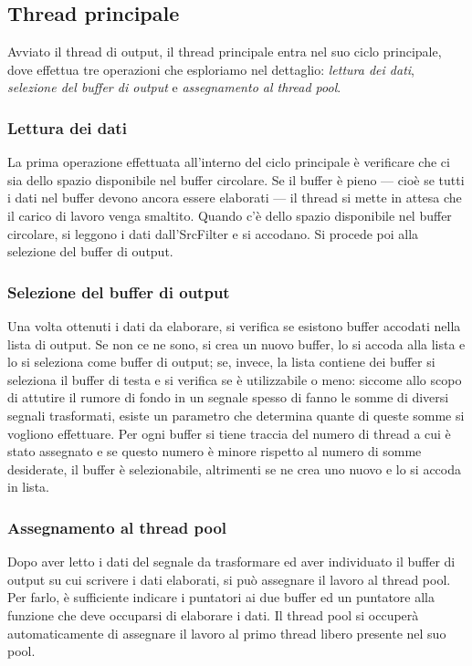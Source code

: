 \subsection{Thread principale}
Avviato il thread di output, il thread principale entra nel suo ciclo
principale, dove effettua tre operazioni che esploriamo nel dettaglio:
\emph{lettura dei dati}, \emph{selezione del buffer di output} e
\emph{assegnamento al thread pool}.
\subsubsection{Lettura dei dati}
La prima operazione effettuata all'interno del ciclo principale \`e verificare
che ci sia dello spazio disponibile nel buffer circolare. Se il buffer \`e
pieno --- cio\`e se tutti i dati nel buffer devono ancora essere elaborati ---
il thread si mette in attesa che il carico di lavoro venga smaltito. Quando
c'\`e dello spazio disponibile nel buffer circolare, si leggono i dati
dall'SrcFilter e si accodano. Si procede poi alla selezione del buffer di
output.
\subsubsection{Selezione del buffer di output}
Una volta ottenuti i dati da elaborare, si verifica se esistono buffer accodati
nella lista di output. Se non ce ne sono, si crea un nuovo buffer, lo si accoda
alla lista e lo si seleziona come buffer di output; se, invece, la lista
contiene dei buffer si seleziona il buffer di testa e si verifica se \`e
utilizzabile o meno: siccome allo scopo di attutire il rumore di fondo in un
segnale spesso di fanno le somme di diversi segnali trasformati, esiste un
parametro che determina quante di queste somme si vogliono effettuare. Per ogni
buffer si tiene traccia del numero di thread a cui \`e stato assegnato e se
questo numero \`e minore rispetto al numero di somme desiderate, il buffer \`e
selezionabile, altrimenti se ne crea uno nuovo e lo si accoda in lista.
\subsubsection{Assegnamento al thread pool}
Dopo aver letto i dati del segnale da trasformare ed aver individuato il buffer
di output su cui scrivere i dati elaborati, si può assegnare il lavoro al thread
pool. Per farlo, \`e sufficiente indicare i puntatori ai due buffer ed un
puntatore alla funzione che deve occuparsi di elaborare i dati. Il thread pool
si occuper\`a automaticamente di assegnare il lavoro al primo thread libero
presente nel suo pool.
